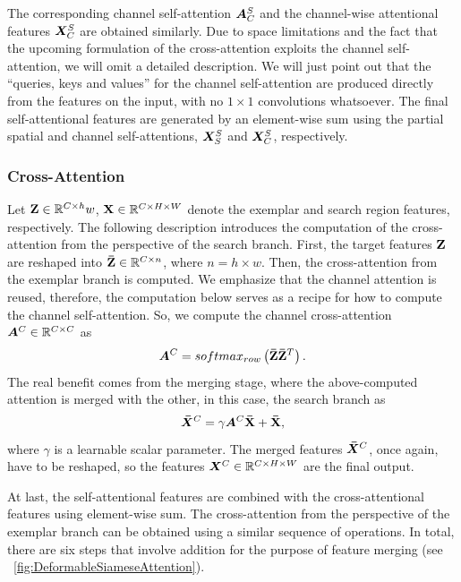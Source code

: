 The corresponding channel self-attention $\bm{A}_{C}^{S}$ and the channel-wise attentional features $\bm{X}_{C}^{S}$ are obtained similarly. Due to space limitations and the fact that the upcoming formulation of the cross-attention exploits the channel self-attention, we will omit a detailed description. We will just point out that the ``queries, keys and values'' for the channel self-attention are produced directly from the features on the input, with no $1 \times 1$ convolutions whatsoever. The final self-attentional features are generated by an element-wise sum using the partial spatial and channel self-attentions, $\bm{X}_{S}^{S}$ and $\bm{X}_{C}^{S}$, respectively.

\subsubsection{Cross-Attention}

Let $\mathbf{Z} \in \mathbb{R}^{{C} \times {h}}{w}$, $\mathbf{X} \in \mathbb{R}^{{C} \times {H} \times {W}}$ denote the exemplar and search region features, respectively. The following description introduces the computation of the cross-attention from the perspective of the search branch. First, the target features $\mathbf{Z}$ are reshaped into $\mathbf{\bar{Z}} \in \mathbb{R}^{{C} \times {n}}$, where $n = h \times w$. Then, the cross-attention from the exemplar branch is computed. We emphasize that the channel attention is reused, therefore, the computation below serves as a recipe for how to compute the channel self-attention. So, we compute the channel cross-attention $\bm{A}^{C} \in \mathbb{R}^{{C} \times {C}}$ as
\begin{equation}
    \label{eq:CrossAttentionCalc}
    \bm{A}^{C} =
    {softmax_{row}} \left( \mathbf{\bar{Z}} \mathbf{\bar{Z}}^T \right).
\end{equation}
The real benefit comes from the merging stage, where the above-computed attention is merged with the other, in this case, the search branch as
\begin{equation}
    \label{eq:CrossAttentionMerge}
    \bm{\bar{X}}^{C} =
    \gamma \bm{A}^{C} \mathbf{\bar{X}} + \mathbf{\bar{X}},
\end{equation}
where $\gamma$ is a learnable scalar parameter. The merged features $\bm{\bar{X}}^{C}$, once again, have to be reshaped, so the features $\bm{X}^{C} \in \mathbb{R}^{{C} \times {H} \times {W}}$ are the final output.

At last, the self-attentional features are combined with the cross-attentional features using element-wise sum. The cross-attention from the perspective of the exemplar branch can be obtained using a similar sequence of operations. In total, there are six steps that involve addition for the purpose of feature merging (see \figtext{}~\ref{fig:DeformableSiameseAttention}).

